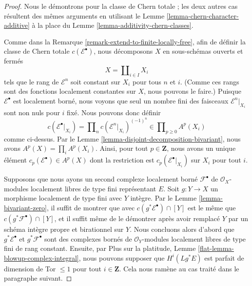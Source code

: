 \begin{proof}
Nous le démontrons pour la classe de Chern totale ; les deux autres cas résultent
des mêmes arguments en utilisant le
Lemme \ref{lemma-chern-character-additive}
à la place du
Lemme \ref{lemma-additivity-chern-classes}.

\medskip\noindent
Comme dans la Remarque \ref{remark-extend-to-finite-locally-free}, afin
de définir la classe de Chern totale $c(\mathcal{E}^\bullet)$,
nous décomposons $X$ en sous-schémas ouverts et fermés
$$
X = \coprod\nolimits_{i \in I} X_i
$$
tels que le rang de $\mathcal{E}^n$ soit constant sur $X_i$ pour
tous $n$ et $i$. (Comme ces rangs sont des fonctions localement constantes
sur $X$, nous pouvons le faire.) Puisque $\mathcal{E}^\bullet$ est localement
borné, nous voyons que seul un nombre fini des faisceaux
$\mathcal{E}^n|_{X_i}$ sont non nuls pour $i$ fixé. Nous pouvons donc
définir
$$
c(\mathcal{E}^\bullet|_{X_i}) =
\prod\nolimits_n c(\mathcal{E}^n|_{X_i})^{(-1)^n}
\in \prod\nolimits_{p \geq 0} A^p(X_i)
$$
comme ci-dessus. Par le Lemme \ref{lemma-disjoint-decomposition-bivariant},
nous avons $A^p(X) = \prod_i A^p(X_i)$. Ainsi, pour tout $p \in \mathbf{Z}$,
nous avons un unique élément $c_p(\mathcal{E}^\bullet) \in A^p(X)$ dont la restriction
est $c_p(\mathcal{E}^\bullet|_{X_i})$ sur $X_i$ pour tout $i$.

\medskip\noindent
Supposons que nous ayons un second complexe localement borné
$\mathcal{F}^\bullet$ de $\mathcal{O}_X$-modules localement libres de type fini
représentant $E$.
Soit $g : Y \to X$ un morphisme localement de type fini avec $Y$ intègre.
Par le Lemme \ref{lemma-bivariant-zero}, il suffit de montrer que
avec $c(g^*\mathcal{E}^\bullet) \cap [Y]$ est le même que
$c(g^*\mathcal{F}^\bullet) \cap [Y]$, et il suffit même de le démontrer
après avoir remplacé $Y$ par un schéma intègre propre et birationnel
sur $Y$. Nous concluons alors d'abord que $g^*\mathcal{E}^\bullet$
et $g^*\mathcal{F}^\bullet$ sont des complexes bornés de
$\mathcal{O}_Y$-modules localement libres de type fini de rang constant. Ensuite, par
Plus sur la platitude, Lemme \ref{flat-lemma-blowup-complex-integral},
nous pouvons supposer que $H^i(Lg^*E)$ est parfait de dimension de Tor $\leq 1$
pour tout $i \in \mathbf{Z}$.
Cela nous ramène au cas traité dans le paragraphe suivant.


\end{proof}
